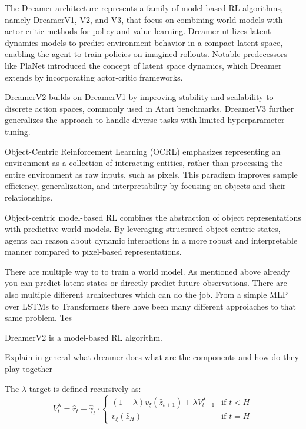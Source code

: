 \documentclass[
	english,
	ruledheaders=section,
	class=report,
	thesis={type=master},
	accentcolor=9c,
	custommargins=true,
	marginpar=false,
	parskip=half-,
	fontsize=11pt,
]{tudapub}
\begin{document}
The Dreamer architecture represents a family of model-based RL algorithms, namely DreamerV1, V2, and V3, that focus on combining world models with actor-critic methods for policy and value learning. Dreamer utilizes latent dynamics models to predict environment behavior in a compact latent space, enabling the agent to train policies on imagined rollouts. Notable predecessors like PlaNet introduced the concept of latent space dynamics, which Dreamer extends by incorporating actor-critic frameworks.

DreamerV2 builds on DreamerV1 by improving stability and scalability to discrete action spaces, commonly used in Atari benchmarks. DreamerV3 further generalizes the approach to handle diverse tasks with limited hyperparameter tuning.



Object-Centric Reinforcement Learning (OCRL) emphasizes representing an environment as a collection of interacting entities, rather than processing the entire environment as raw inputs, such as pixels. This paradigm improves sample efficiency, generalization, and interpretability by focusing on objects and their relationships.

Object-centric model-based RL combines the abstraction of object representations with predictive world models. By leveraging structured object-centric states, agents can reason about dynamic interactions in a more robust and interpretable manner compared to pixel-based representations.


There are multiple way to to train a world model. As mentioned above already you can predict latent states or directly predict future observations. There are also multiple different architectures which can do the job. From a simple MLP over LSTMs to Transformers there have been many different approiaches to that same problem. Tes

DreamerV2 \cite{hafner2019dreamer} is a model-based RL algorithm.

Explain in general what dreamer does
what are the components and how do they play together

The $\lambda$-target is defined recursively as:
\begin{equation}
	V^{\lambda}_t = \hat{r}_t + \hat{\gamma}_t \cdot \begin{cases}
		(1 - \lambda)v_\xi(\hat{z}_{t+1}) + \lambda V^{\lambda}_{t+1} & \text{if } t < H \\
		v_\xi(\hat{z}_H)                                              & \text{if } t = H
	\end{cases}
\end{equation}
\end{document}
